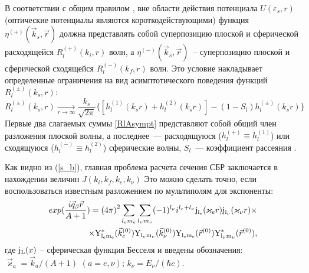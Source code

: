 В соответствии с общим правилом \cite{landau}, вне области действия потенциала
$U(\varepsilon_s,r)$ (оптические потенциалы являются
короткодействующими) функция $\eta^{(+)} (\vec k_s, \vec r)$ должна представлять собой
суперпозицию плоской и сферической расходящейся $R_l^{(+)}(k_i,r)$ волн,
а $\eta^{(-)} (\vec k_s, \vec r)$~--
суперпозицию плоской и сферической сходящейся $R_l^{(-)}(k_f,r)$ волн.
Это условие накладывает
определенные ограничения на вид асимптотического поведения функций
$R_l^{(\pm)}(k_s,r)$:
\begin{equation}
\label{RlAsympt}
R_l^{(\pm)}(k_s,r)\xrightarrow[r\to\infty]{}\frac{k_s}{\sqrt{2\pi}}%
\{[h_l^{(1)}(k_sr)+h_l^{(2)}(k_sr)]-(1-S_l)h_l^{(\pm)}(k_sr)\}
\end{equation}
Первые два слагаемых суммы \eqref{RlAsympt} представляют собой общий член
разложения плоской волны, а последнее~---
расходящуюся ($h_l^{(+)}\equiv h_l^{(1)}$)
или сходящуюся ($h_l^{(-)}\equiv h_l^{(2)}$) сферические волны,
$S_l$~--- коэффициент рассеяния \cite{landau}.


Как видно из (\ref{s_b}), главная проблема расчета сечения СБР
заключается в нахождении величин $J(k_i,k_f,k_e,k_\nu)$
Это можно сделать точно, если воспользоваться известным разложением
по мультиполям для экспоненты:
\begin{eqnarray}\label{exp}
exp({i\vec q_\beta \vec r \over A+1})={(4\pi)}^2 \sum_{l_e m_e}
\sum_{l_\nu m_\nu}(-1)^{l_\nu} i^{l_e+l_\nu} {\rm j_{l_e}}(\varkappa_e r)
{\rm j_{l_\nu}}(\varkappa_\nu r)\times \nonumber \\
\times {\rm Y^*_{l_e m_e}}(\vec k^{(0)}_e)
{\rm Y_{l_\nu m_\nu}}(\vec k^{(0)}_\nu){\rm Y_{l_e m_e}}(\vec r^{(0)})
{\rm Y^*_{l_\nu m_\nu}}(\vec r^{(0)}),
\end{eqnarray}
где ${\rm j_L}(x)$ -- сферическая функция Бесселя и введены обозначения:
$\vec \varkappa_a=\vec k_a/(A+1)$ $(a=e,\nu)$; $k_\nu=E_\nu/(\hbar c)$.

